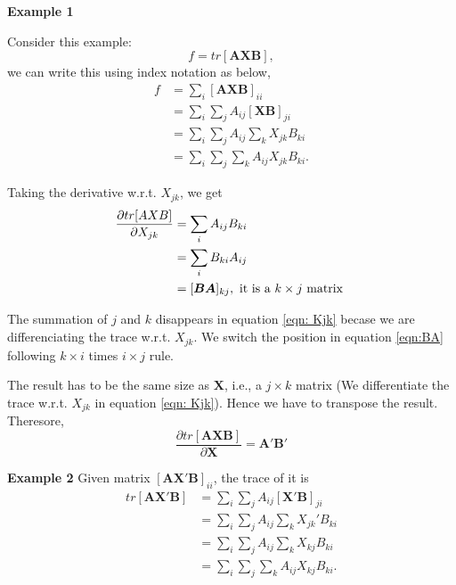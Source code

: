 \documentclass[10pt]{article}
\begin{document}
{\textbf {Example 1}}

Consider this example:
\begin{equation}
		f = tr[\bm{AXB}],
\end{equation}
we can write this using index notation as below,
\begin{align*}
		f &= \sum\limits_{i} [\bm{AXB}]_{ii} \\
			&= \sum\limits_{i} \sum\limits_{j} A_{ij}[\bm{XB}]
			_{ji}\\
			&= \sum\limits_{i} \sum\limits_{j} A_{ij}
			\sum\limits_{k} X_{jk}B_{ki}\\
			&= \sum\limits_{i} \sum\limits_{j} \sum\limits_{k}
			A_{ij}X_{jk}B_{ki}.
\end{align*}


Taking the derivative w.r.t. $ X_{jk} $, we get
\begin{align}
		\frac{\partial tr[AXB] }{\partial X_{jk} } &= 
\sum\limits_{i} A_{ij}B_{ki} \label{eqn: Kjk}\\
&= \sum\limits_{i} B_{ki}A_{ij} \label{eqn:BA}\\
&= [\bm{BA}]_{kj}, \text{ it is a $ k  \times j $ matrix }
\end{align}

The summation of $ j $ and $ k $ disappears in equation \eqref{eqn: Kjk} becase
we are differenciating the trace w.r.t. $ X_{jk} $. We switch the position in 
equation \eqref{eqn:BA} following $ k  \times  i $ times $ i  \times j $ rule.





The result has to be the same size as $ \bm{X} $, 
i.e., a $ j  \times  k $ matrix (We differentiate the
trace w.r.t. $ X_{jk} $ in equation \eqref{eqn: Kjk}). Hence we have to transpose the result. Theresore,
\begin{equation}
		\frac{\partial tr[\bm{AXB}] }{\partial \bm{X} }
		=\bm{A}'\bm{B}' \label{eqn:axb}
\end{equation}



{\textbf {Example 2}}
Given  matrix $ [\bm{AX}'\bm{B}]_{ii} $, the trace of it is
\begin{align*}
		tr[\bm{AX}'\bm{B}] &= \sum\limits_{i}\sum\limits_{j}
		A_{ij}[\bm{X'}\bm{B}]_{ji}\\
		&= \sum\limits_{i}\sum\limits_{j}A_{ij}
		\sum\limits_{k} X_{jk}'B_{ki}\\
		&= \sum\limits_{i}\sum\limits_{j}A_{ij}
		\sum\limits_{k} X_{kj}B_{ki}\\
		&= \sum\limits_{i}\sum\limits_{j}\sum\limits_{k}A_{ij}
		 X_{kj}B_{ki}.
\end{align*}
\end{document}
